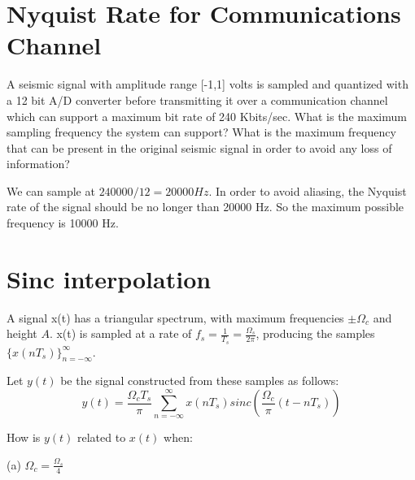 \documentclass[11pt]{article}
\begin{document}
\section{Nyquist Rate for Communications Channel}

A seismic signal with amplitude range [-1,1] volts is sampled and quantized with a 12 bit A/D converter before transmitting it over a communication channel which can support a maximum bit rate of 240 Kbits/sec. What is the maximum sampling frequency the system can support? What is the maximum frequency that can be present in the original seismic signal in order to avoid any loss of information?

{\color{blue}
We can sample at $240000/12 = 20000 Hz$. In order to avoid aliasing, the Nyquist rate of the signal should be no longer than 20000 Hz. So the maximum possible frequency is 10000 Hz.



}

\section{Sinc interpolation}
A signal x(t) has a triangular spectrum, with maximum frequencies $\pm \Omega_c$ and height $A$. x(t) is sampled at a rate of $f_s = \frac{1}{T_s}=\frac{\Omega_s}{2 \pi}$, producing the samples $\{x(nT_s)\}_{n=-\infty}^\infty$.

Let $y(t)$ be the signal constructed from these samples as follows:
\[
y(t) = \frac{ \Omega_c T_s}{\pi} \sum_{n=-\infty}^\infty x(nT_s) sinc\left( \frac{\Omega_c}{\pi} (t-nT_s) \right)
\]

How is $y(t)$ related to $x(t)$ when:

(a) $\Omega_c = \frac{\Omega_s}{4}$ 
\end{document}
